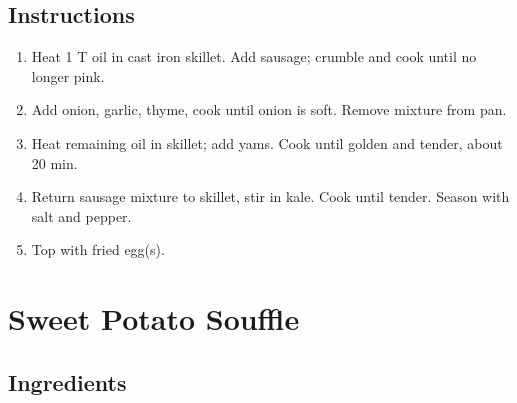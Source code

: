\documentclass[letterpaper,10pt,english]{sphinxmanual}
\begin{document}
\section{Instructions}
\label{\detokenize{SPH:instructions}}\begin{enumerate}
\item {} 
Heat 1 T oil in cast iron skillet. Add sausage; crumble and cook until no longer pink.

\item {} 
Add onion, garlic, thyme, cook until onion is soft. Remove mixture from pan.

\item {} 
Heat remaining oil in skillet; add yams.  Cook until golden and tender, about 20 min.

\item {} 
Return sausage mixture to skillet, stir in kale. Cook until tender. Season with salt and pepper.

\item {} 
Top with fried egg(s).

\end{enumerate}


\chapter{Sweet Potato Souffle}
\label{\detokenize{Sweet_PS:sweet-potato-souffle}}\label{\detokenize{Sweet_PS::doc}}

\section{Ingredients}
\label{\detokenize{Sweet_PS:ingredients}}
%
\begin{sphinxVerbatim}[commandchars=\\\{\}]
     
  
 
   
  
   
   
   
\end{sphinxVerbatim}
\end{document}
